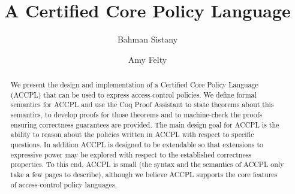\documentclass[runningheads,a4paper]{llncs}
\begin{document}



\title{A Certified Core Policy Language}

\author{Bahman Sistany \and Amy Felty}

%
\iffalse
\author{Firstname Lastname\inst{1} \and Firstname Lastname\inst{2} }

\institute{
Insitute 1\\
\email{...}\and
Insitute 2\\
\email{...}
}
\fi
			
\maketitle

\begin{abstract}
We present the design and implementation of a Certified Core Policy
Language (ACCPL) that can be used to express access-control policies.
We define formal semantics for ACCPL and use the Coq Proof Assistant
to state theorems about this semantics, to develop proofs for those
theorems and to machine-check the proofs ensuring correctness
guarantees are provided. The main design goal for ACCPL is the ability
to reason about the policies written in ACCPL with respect to specific
questions. In addition ACCPL is designed to be extendable so that
extensions to expressive power may be explored with respect to the
established correctness properties.  To this end, ACCPL is small (the
syntax and the semantics of ACCPL only take a few pages to describe),
although we believe ACCPL supports the core features of access-control
policy languages.
\end{abstract}
\end{document}
